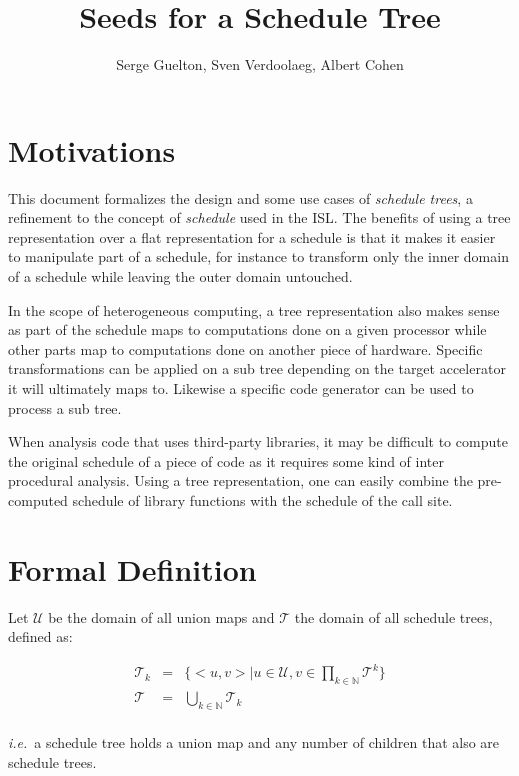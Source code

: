 \documentclass{article}
\title{Seeds for a Schedule Tree} %
\author{Serge Guelton, Sven Verdoolaeg, Albert Cohen}
\begin{document}
\maketitle

\section*{Motivations}

This document formalizes the design and some use cases of \emph{schedule
trees}, a refinement to the concept of \emph{schedule} used in the \ac{ISL}. The
benefits of using a tree representation over a flat representation for a
schedule is that it makes it easier to manipulate part of a schedule, for
instance to transform only the inner domain of a schedule while leaving the
outer domain untouched.

In the scope of heterogeneous computing, a tree representation also makes sense
as part of the schedule maps to computations done on a given processor while
other parts map to computations done on another piece of hardware. Specific
transformations can be applied on a sub tree depending on the target
accelerator it will ultimately maps to. Likewise a specific code generator can
be used to process a sub tree.

When analysis code that uses third-party libraries, it may be difficult to
compute the original schedule of a piece of code as it requires some kind of
inter procedural analysis. Using a tree representation, one can easily combine
the pre-computed schedule of library functions with the schedule of the call
site.

\section{Formal Definition}

Let $\mathcal{U}$ be the domain of all union maps and $\mathcal{T}$ the domain
of all schedule trees, defined as:

\[
    \begin{array}{lcl}
        \mathcal{T}_k &=& \{ <u, v> | u \in \mathcal{U}, v \in \displaystyle\prod_{k\in\mathbb{N}}\mathcal{T}^k \} \\
        \mathcal{T} &=& \displaystyle\bigcup_{k\in\mathbb{N}} \mathcal{T}_k\\
    \end{array}
\]

\noindent \emph{i.e.}\ a schedule tree holds a union map and any number of children that also are schedule trees.
\end{document}

